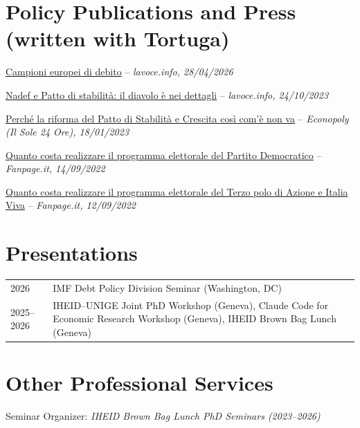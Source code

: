 \documentclass[letterpaper,11pt]{article}
\makeatletter
\newcommand{\press}[3]{%
    \href{#1}{#2} -- \textit{#3}\par\vspace{4pt}}
\newenvironment{rows}{%
    \begin{tabular}{@{}p{2.8cm}p{\dimexpr\textwidth-2.8cm-2\tabcolsep}@{}}}%
    {\end{tabular}}
\makeatother
\begin{document}
\section*{Policy Publications and Press {\normalsize\mdseries(written with Tortuga)}}

\press{https://lavoce.info/archives/111182/campioni-europei-di-debito/}{Campioni europei di debito}{lavoce.info, 28/04/2026}
\press{https://lavoce.info/archives/102561/nadef-e-patto-di-stabilita-il-diavolo-e-nei-dettagli/}{Nadef e Patto di stabilità: il diavolo è nei dettagli}{lavoce.info, 24/10/2023}
\press{https://www.econopoly.ilsole24ore.com/2023/01/18/riforma-patto-stabilita-crescita/}{Perché la riforma del Patto di Stabilità e Crescita così com'è non va}{Econopoly (Il Sole 24 Ore), 18/01/2023}
\press{https://www.fanpage.it/politica/quanto-costa-realizzare-il-programma-elettorale-del-partito-democratico/}{Quanto costa realizzare il programma elettorale del Partito Democratico}{Fanpage.it, 14/09/2022}
\press{https://www.fanpage.it/politica/quanto-costa-realizzare-il-programma-elettorale-del-terzo-polo-di-azione-e-italia-viva/}{Quanto costa realizzare il programma elettorale del Terzo polo di Azione e Italia Viva}{Fanpage.it, 12/09/2022}

\section*{Presentations}

\begin{rows}
2026      & IMF Debt Policy Division Seminar (Washington, DC)\\[3pt]
2025--2026 & IHEID--UNIGE Joint PhD Workshop (Geneva), Claude Code for Economic Research Workshop (Geneva), IHEID Brown Bag Lunch (Geneva)
\end{rows}

\section*{Other Professional Services}

Seminar Organizer: \textit{IHEID Brown Bag Lunch PhD Seminars (2023--2026)}

\end{document}
